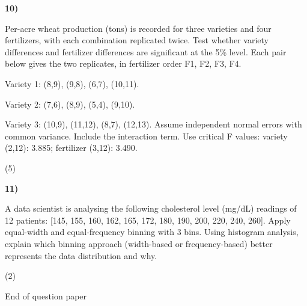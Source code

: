 \documentclass[11pt,a4paper]{article}
\newcommand{\question}[3]{\par\vspace{8pt}\noindent\begin{minipage}[t]{0.075\linewidth}\textbf{#1)}\end{minipage}\begin{minipage}[t]{0.855\linewidth}#3\end{minipage}\hfill\begin{minipage}[t]{0.055\linewidth}\raggedleft(#2)\end{minipage}\par}
\begin{document}
\question{10}{5}{Per-acre wheat production (tons) is recorded for three varieties and four fertilizers, with each combination replicated twice. Test whether variety differences and fertilizer differences are significant at the 5\% level. Each pair below gives the two replicates, in fertilizer order F1, F2, F3, F4.\par Variety 1: (8,9), (9,8), (6,7), (10,11).\par Variety 2: (7,6), (8,9), (5,4), (9,10).\par Variety 3: (10,9), (11,12), (8,7), (12,13). Assume independent normal errors with common variance. Include the interaction term. Use critical F values: variety (2,12): 3.885; fertilizer (3,12): 3.490.}
\question{11}{2}{A data scientist is analysing the following cholesterol level (mg/dL) readings of 12 patients: [145, 155, 160, 162, 165, 172, 180, 190, 200, 220, 240, 260]. Apply equal-width and equal-frequency binning with 3 bins. Using histogram analysis, explain which binning approach (width-based or frequency-based) better represents the data distribution and why.}
\vfill\begin{center}\small End of question paper\end{center}
\end{document}
